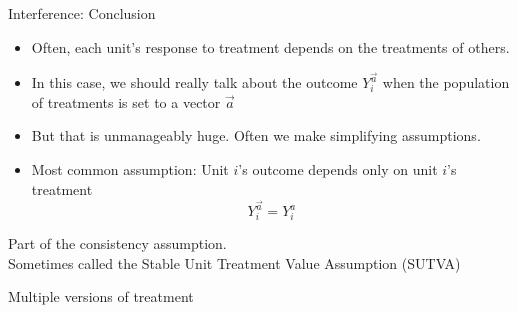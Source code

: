 \documentclass{beamer}
\newcommand\bgray[1]{\textcolor{gray}{\textbf{#1}}}
\begin{document}
\begin{frame}{Interference: Conclusion}

\begin{itemize}[<+->]
\item Often, each unit's response to treatment depends on the treatments of others.
\item In this case, we should really talk about the outcome $Y_i^{\vec{a}}$ when the population of treatments is set to a vector $\vec{a}$
\item But that is unmanageably huge. Often we make simplifying assumptions.
\item Most common assumption: Unit $i$'s outcome depends only on unit $i$'s treatment $$Y_i^{\vec{a}} = Y_i^a$$
\end{itemize} \pause
Part of the consistency assumption.\\Sometimes called the Stable Unit Treatment Value Assumption (SUTVA)

\end{frame}

\begin{frame}
\huge Multiple versions of treatment
\end{frame}

\end{document}
